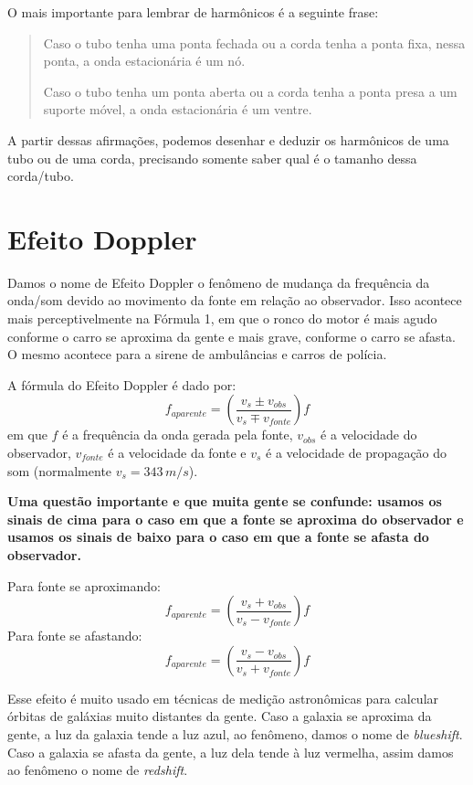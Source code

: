 \documentclass[12pt]{extarticle}
\newcommand{\<}{\langle}
\renewcommand{\>}{\rangle}
\theoremstyle{definition}
\begin{document}
O mais importante para lembrar de harmônicos é a seguinte frase:
\begin{quote}
    Caso o tubo tenha uma ponta fechada ou a corda tenha a ponta fixa, nessa ponta, a onda estacionária é um nó.
    
    Caso o tubo tenha um ponta aberta ou a corda tenha a ponta presa a um suporte móvel, a onda estacionária é um ventre.
\end{quote}

A partir dessas afirmações, podemos desenhar e deduzir os harmônicos de uma tubo ou de uma corda, precisando somente saber qual é o tamanho dessa corda/tubo.

\section{Efeito Doppler}

Damos o nome de Efeito Doppler o fenômeno de mudança da frequência da onda/som devido ao movimento da fonte em relação ao observador. Isso acontece mais perceptivelmente na Fórmula 1, em que o ronco do motor é mais agudo conforme o carro se aproxima da gente e mais grave, conforme o carro se afasta. O mesmo acontece para a sirene de ambulâncias e carros de polícia.

A fórmula do Efeito Doppler é dado por:
\begin{equation}
    f_{aparente} = \left(\frac{v_{s} \pm v_{obs}}{v_s \mp v_{fonte} }\right)f
\end{equation}
\noindent em que $f$ é a frequência da onda gerada pela fonte, $v_{obs}$ é a velocidade do observador, $v_{fonte}$ é a velocidade da fonte e $v_s$ é a velocidade de propagação do som (normalmente $v_s=343\,m/s$).

\textbf{Uma questão importante e que muita gente se confunde: usamos os sinais de cima para o caso em que a fonte se aproxima do observador e usamos os sinais de baixo para o caso em que a fonte se afasta do observador.}

Para fonte se aproximando:
\begin{equation}
     f_{aparente} = \left(\frac{v_{s} + v_{obs}}{v_s - v_{fonte} }\right)f
\end{equation}
Para fonte se afastando:
\begin{equation}
     f_{aparente} = \left(\frac{v_{s} - v_{obs}}{v_s + v_{fonte} }\right)f
\end{equation}

Esse efeito é muito usado em técnicas de medição astronômicas para calcular órbitas de galáxias muito distantes da gente. Caso a galaxia se aproxima da gente, a luz da galaxia tende a luz azul, ao fenômeno, damos o nome de \textit{blueshift}. Caso a galaxia se afasta da gente, a luz dela tende à luz vermelha, assim damos ao fenômeno o nome de \textit{redshift}.
\end{document}
